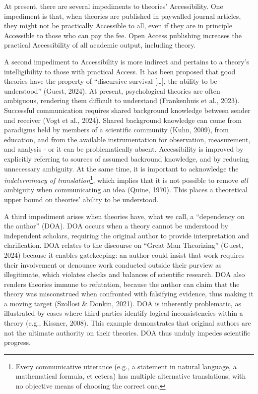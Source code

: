 \documentclass[
  man, noextraspace,floatsintext]{apa6}
\begin{document}
At present, there are several impediments to theories' Accessibility.
One impediment is that,
when theories are published in paywalled journal articles,
they might not be practically Accessible to all,
even if they are in principle Accessible to those who can pay the fee.
Open Access publishing increases the practical Accessibility of all academic output, including theory.

A second impediment to Accessibility is more indirect
and pertains to a theory's intelligibility to those with practical Access.
It has been proposed that good theories have the property of ``discursive survival {[}\ldots{]}, the ability to be understood'' (Guest, 2024).
At present, psychological theories are often ambiguous, rendering them difficult to understand (Frankenhuis et al., 2023).
Successful communication requires shared background knowledge between sender and receiver (Vogt et al., 2024).
Shared background knowledge can come from paradigms held by members of a scientific community (Kuhn, 2009),
from education, and from the available instrumentation for observation, measurement, and analysis - or it can be problematically absent.
Accessibility is improved by explicitly referring to sources of assumed backround knowledge, and by reducing unnecessary ambiguity.
At the same time, it is important to acknowledge the \emph{indeterminacy of translation}\footnote{Every communicative utterance (e.g., a statement in natural language, a mathematical formula, et cetera)
  has multiple alternative translations, with no objective means of choosing the correct one.},
which implies that it is not possible to remove \emph{all} ambiguity when communicating an idea (Quine, 1970).
This places a theoretical upper bound on theories' ability to be understood.

A third impediment arises when theories have, what we call, a ``dependency on the author'' (DOA).
DOA occurs when a theory cannot be understood by independent scholars,
requiring the original author to provide interpretation and clarification.
DOA relates to the discourse on ``Great Man Theorizing'' (Guest, 2024) because it enables gatekeeping: an author could insist that work requires their involvement or denounce work conducted outside their purview as illegitimate,
which violates checks and balances of scientific research.
DOA also renders theories immune to refutation,
because the author can claim that the theory was misconstrued when confronted with falsifying evidence, thus making it a moving target (Szollosi \& Donkin, 2021).
DOA is inherently problematic, as illustrated by cases where third parties identify logical inconsistencies within a theory (e.g., Kissner, 2008).
This example demonstrates that original authors are not the ultimate authority on their theories.
DOA thus unduly impedes scientific progress.
\end{document}
